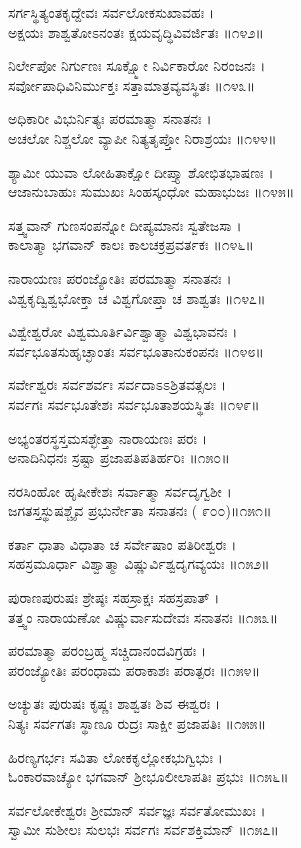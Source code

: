 ಸರ್ಗಸ್ಥಿತ್ಯಂತಕೃದ್ದೇವಃ ಸರ್ವಲೋಕಸುಖಾವಹಃ ।\\
ಅಕ್ಷಯಃ ಶಾಶ್ವತೋಽನಂತಃ ಕ್ಷಯವೃದ್ಧಿವಿವರ್ಜಿತಃ ॥೧೪೨॥

ನಿರ್ಲೇಪೋ ನಿರ್ಗುಣಃ ಸೂಕ್ಷ್ಮೋ ನಿರ್ವಿಕಾರೋ ನಿರಂಜನಃ ।\\
ಸರ್ವೋಪಾಧಿವಿನಿರ್ಮುಕ್ತಃ ಸತ್ತಾಮಾತ್ರವ್ಯವಸ್ಥಿತಃ ॥೧೪೩॥

ಅಧಿಕಾರೀ ವಿಭುರ್ನಿತ್ಯಃ ಪರಮಾತ್ಮಾ ಸನಾತನಃ ।\\
ಅಚಲೋ ನಿಶ್ಚಲೋ ವ್ಯಾಪೀ ನಿತ್ಯತೃಪ್ತೋ ನಿರಾಶ್ರಯಃ ॥೧೪೪॥

ಶ್ಯಾಮೀ ಯುವಾ ಲೋಹಿತಾಕ್ಷೋ ದೀಪ್ತ್ಯಾ ಶೋಭಿತಭಾಷಣಃ ।\\
ಆಜಾನುಬಾಹುಃ ಸುಮುಖಃ ಸಿಂಹಸ್ಕಂಧೋ ಮಹಾಭುಜಃ ॥೧೪೫॥

ಸತ್ತ್ವವಾನ್ ಗುಣಸಂಪನ್ನೋ ದೀಪ್ಯಮಾನಃ ಸ್ವತೇಜಸಾ ।\\
ಕಾಲಾತ್ಮಾ ಭಗವಾನ್ ಕಾಲಃ ಕಾಲಚಕ್ರಪ್ರವರ್ತಕಃ ॥೧೪೬॥

ನಾರಾಯಣಃ ಪರಂಜ್ಯೋತಿಃ ಪರಮಾತ್ಮಾ ಸನಾತನಃ ।\\
ವಿಶ್ವಕೃದ್ವಿಶ್ವಭೋಕ್ತಾ ಚ ವಿಶ್ವಗೋಪ್ತಾ ಚ ಶಾಶ್ವತಃ ॥೧೪೭॥

ವಿಶ್ವೇಶ್ವರೋ ವಿಶ್ವಮೂರ್ತಿರ್ವಿಶ್ವಾತ್ಮಾ ವಿಶ್ವಭಾವನಃ ।\\
ಸರ್ವಭೂತಸುಹೃಚ್ಛಾಂತಃ ಸರ್ವಭೂತಾನುಕಂಪನಃ ॥೧೪೮॥

ಸರ್ವೇಶ್ವರಃ ಸರ್ವಶರ್ವಃ ಸರ್ವದಾಽಽಶ್ರಿತವತ್ಸಲಃ ।\\
ಸರ್ವಗಃ ಸರ್ವಭೂತೇಶಃ ಸರ್ವಭೂತಾಶಯಸ್ಥಿತಃ ॥೧೪೯॥

ಅಭ್ಯಂತರಸ್ಥಸ್ತಮಸಶ್ಛೇತ್ತಾ ನಾರಾಯಣಃ ಪರಃ ।\\
ಅನಾದಿನಿಧನಃ ಸ್ರಷ್ಟಾ ಪ್ರಜಾಪತಿಪತಿರ್ಹರಿಃ ॥೧೫೦॥

ನರಸಿಂಹೋ ಹೃಷೀಕೇಶಃ ಸರ್ವಾತ್ಮಾ ಸರ್ವದೃಗ್ವಶೀ ।\\
ಜಗತಸ್ತಸ್ಥುಷಶ್ಚೈವ ಪ್ರಭುರ್ನೇತಾ ಸನಾತನಃ ( ೯೦೦)॥೧೫೧॥

ಕರ್ತಾ ಧಾತಾ ವಿಧಾತಾ ಚ ಸರ್ವೇಷಾಂ ಪತಿರೀಶ್ವರಃ ।\\
ಸಹಸ್ರಮೂರ್ಧಾ ವಿಶ್ವಾತ್ಮಾ ವಿಷ್ಣುರ್ವಿಶ್ವದೃಗವ್ಯಯಃ ॥೧೫೨॥

ಪುರಾಣಪುರುಷಃ ಶ್ರೇಷ್ಠಃ ಸಹಸ್ರಾಕ್ಷಃ ಸಹಸ್ರಪಾತ್ ।\\
ತತ್ತ್ವಂ ನಾರಾಯಣೋ ವಿಷ್ಣುರ್ವಾಸುದೇವಃ ಸನಾತನಃ ॥೧೫೩॥

ಪರಮಾತ್ಮಾ ಪರಂಬ್ರಹ್ಮ ಸಚ್ಚಿದಾನಂದವಿಗ್ರಹಃ ।\\
ಪರಂಜ್ಯೋತಿಃ ಪರಂಧಾಮ ಪರಾಕಾಶಃ ಪರಾತ್ಪರಃ ॥೧೫೪॥

ಅಚ್ಯುತಃ ಪುರುಷಃ ಕೃಷ್ಣಃ ಶಾಶ್ವತಃ ಶಿವ ಈಶ್ವರಃ ।\\
ನಿತ್ಯಃ ಸರ್ವಗತಃ ಸ್ಥಾಣೂ ರುದ್ರಃ ಸಾಕ್ಷೀ ಪ್ರಜಾಪತಿಃ ॥೧೫೫॥

ಹಿರಣ್ಯಗರ್ಭಃ ಸವಿತಾ ಲೋಕಕೃಲ್ಲೋಕಭುಗ್ವಿಭುಃ ।\\
ಓಂಕಾರವಾಚ್ಯೋ ಭಗವಾನ್ ಶ್ರೀಭೂಲೀಲಾಪತಿಃ ಪ್ರಭುಃ ॥೧೫೬॥

ಸರ್ವಲೋಕೇಶ್ವರಃ ಶ್ರೀಮಾನ್ ಸರ್ವಜ್ಞಃ ಸರ್ವತೋಮುಖಃ ।\\
ಸ್ವಾಮೀ ಸುಶೀಲಃ ಸುಲಭಃ ಸರ್ವಗಃ ಸರ್ವಶಕ್ತಿಮಾನ್ ॥೧೫೭॥

